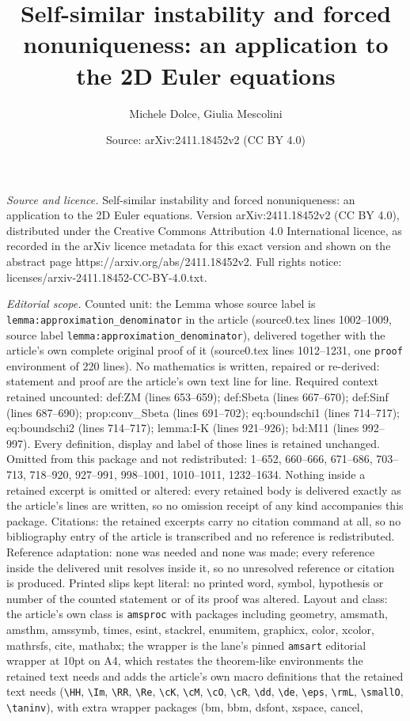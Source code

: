 \documentclass[10pt,a4paper]{amsart}
\title[Self-similar instability and forced nonuniqueness: an applic]{Self-similar instability and forced nonuniqueness: an application to the 2D Euler equations}
\author{Michele Dolce, Giulia Mescolini}
\date{Source: arXiv:2411.18452v2 (CC BY 4.0)}
\begin{document}
\maketitle

\noindent\emph{Source and licence.} Self-similar instability and forced nonuniqueness: an application to the 2D Euler equations. Version arXiv:2411.18452v2 (CC BY 4.0), distributed under the Creative Commons Attribution 4.0 International licence, as recorded in the arXiv licence metadata for this exact version and shown on the abstract page https://arxiv.org/abs/2411.18452v2. Full rights notice: licenses/arxiv-2411.18452-CC-BY-4.0.txt.\par\smallskip

\noindent\textit{Editorial scope.} Counted unit: the Lemma whose source label is \texttt{lemma:approximation\_denominator} in the article (source0.tex lines 1002--1009, source label \texttt{lemma:approximation\_denominator}), delivered together with the article's own complete original proof of it (source0.tex lines 1012--1231, one \texttt{proof} environment of 220 lines). No mathematics is written, repaired or re-derived: statement and proof are the article's own text line for line. Required context retained uncounted: def:ZM (lines 653--659); def:Sbeta (lines 667--670); def:Sinf (lines 687--690); prop:conv\_Sbeta (lines 691--702); eq:boundschi1 (lines 714--717); eq:boundschi2 (lines 714--717); lemma:I-K (lines 921--926); bd:M11 (lines 992--997). Every definition, display and label of those lines is retained unchanged. Omitted from this package and not redistributed: 1--652, 660--666, 671--686, 703--713, 718--920, 927--991, 998--1001, 1010--1011, 1232--1634. Nothing inside a retained excerpt is omitted or altered: every retained body is delivered exactly as the article's lines are written, so no omission receipt of any kind accompanies this package. Citations: the retained excerpts carry no citation command at all, so no bibliography entry of the article is transcribed and no reference is redistributed. Reference adaptation: none was needed and none was made; every reference inside the delivered unit resolves inside it, so no unresolved reference or citation is produced. Printed slips kept literal: no printed word, symbol, hypothesis or number of the counted statement or of its proof was altered. Layout and class: the article's own class is \texttt{amsproc} with packages including geometry, amsmath, amsthm, amssymb, times, esint, stackrel, enumitem, graphicx, color, xcolor, mathrsfs, cite, mathabx; the wrapper is the lane's pinned \texttt{amsart} editorial wrapper at 10pt on A4, which restates the theorem-like environments the retained text needs and adds the article's own macro definitions that the retained text needs (\texttt{\textbackslash HH}, \texttt{\textbackslash Im}, \texttt{\textbackslash RR}, \texttt{\textbackslash Re}, \texttt{\textbackslash cK}, \texttt{\textbackslash cM}, \texttt{\textbackslash cO}, \texttt{\textbackslash cR}, \texttt{\textbackslash dd}, \texttt{\textbackslash de}, \texttt{\textbackslash eps}, \texttt{\textbackslash rmL}, \texttt{\textbackslash smallO}, \texttt{\textbackslash taninv}), with extra wrapper packages (bm, bbm, dsfont, xspace, cancel, 
\end{document}

